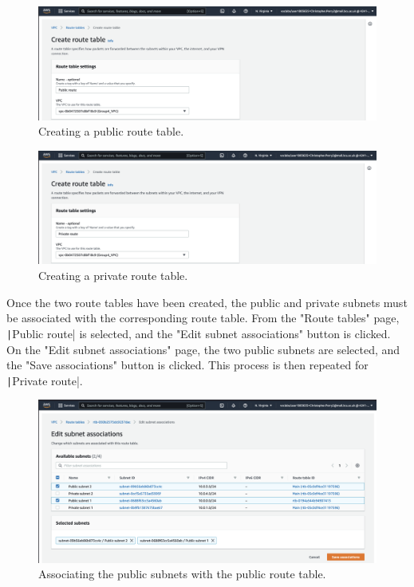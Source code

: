 \begin{figure}[!htbp]
    \centering
    \includegraphics[width=\textwidth]{resources/vpc/routes/vpc-public-route}
    \caption{Creating a public route table.}
    \label{fig:vpc-public-route}
\end{figure}

\begin{figure}[!htbp]
    \centering
    \includegraphics[width=\textwidth]{resources/vpc/routes/vpc-private-route}
    \caption{Creating a private route table.}
    \label{fig:vpc-private-route}
\end{figure}

Once the two route tables have been created, the public and private subnets must be associated with the corresponding
route table.
From the "Route tables" page, \texttt|Public route| is selected, and the "Edit subnet associations" button is
clicked.
On the "Edit subnet associations" page, the two public subnets are selected, and the "Save associations" button is
clicked.
This process is then repeated for \texttt|Private route|.

\begin{figure}[!htbp]
    \centering
    \includegraphics[width=\textwidth]{resources/vpc/routes/vpc-subnet-public-ass}
    \caption{Associating the public subnets with the public route table.}
    \label{fig:vpc-public-ass}
\end{figure}

